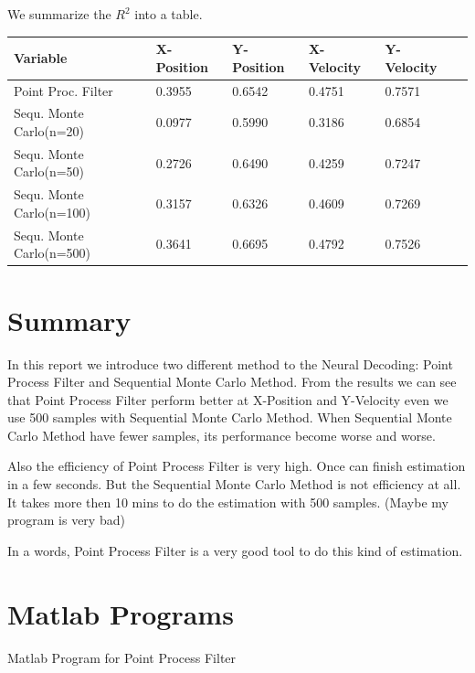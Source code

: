 \documentclass[12pt,letterpaper]{article}
\begin{document}
We summarize the $R^2$ into a table.
\begin{center}
\begin{tabular} { | l | l | l | l | l | l | }
\hline
Variable & X-Position & Y-Position & X-Velocity & Y-Velocity \\ \hline
Point Proc. Filter & 0.3955 &0.6542 & 0.4751 & 0.7571 \\ \hline
Sequ. Monte Carlo(n=20) & 0.0977 & 0.5990 & 0.3186 & 0.6854\\ \hline
Sequ. Monte Carlo(n=50) & 0.2726 & 0.6490 & 0.4259 & 0.7247\\ \hline
Sequ. Monte Carlo(n=100) & 0.3157 & 0.6326 & 0.4609 & 0.7269\\ \hline
Sequ. Monte Carlo(n=500) & 0.3641 & 0.6695 & 0.4792 & 0.7526\\ \hline

\end{tabular}
\end{center}

\section{Summary}
In this report we introduce two different method to the Neural Decoding: Point Process Filter and Sequential Monte Carlo Method. From the results we can see that Point Process Filter perform better at X-Position and Y-Velocity even we use 500 samples with Sequential Monte Carlo Method. When Sequential Monte Carlo Method have fewer samples, its performance become worse and worse. 

Also the efficiency of Point Process Filter is very high. Once can finish estimation in a few seconds. But the Sequential Monte Carlo Method is not efficiency at all. It takes more then 10 mins to do the estimation with 500 samples.  (Maybe my program is very bad)

In a words, Point Process Filter is a very good tool to do this kind of estimation.

\section{Matlab Programs}

Matlab Program for Point Process Filter
\end{document}
